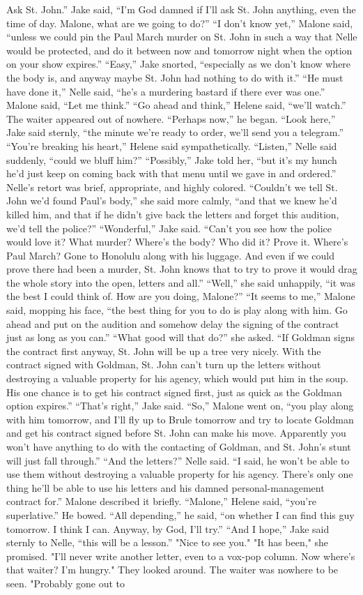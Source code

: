 \documentclass{novel}
\begin{document}
Ask St. John.” Jake said, “I’m God damned if I'll ask St. John anything, even the time of day. Malone, what are we going to do?” “I don’t know yet,” Malone said, “unless we could pin the Paul March murder on St. John in such a way that Nelle would be protected, and do it between now and tomorrow night when the option on your show expires.” “Easy,” Jake snorted, “especially as we don’t know where the body is, and anyway maybe St. John had nothing to do with it.” “He must have done it,” Nelle said, “he’s a murdering bastard if there ever was one.” Malone said, “Let me think.” “Go ahead and think,” Helene said, “we’ll watch.” The waiter appeared out of nowhere. “Perhaps now,” he began. “Look here,” Jake said sternly, “the minute we’re ready to order, we’ll send you a telegram.” “You’re breaking his heart,” Helene said sympathetically. “Listen,” Nelle said suddenly, “could we bluff him?” “Possibly,” Jake told her, “but it’s my hunch he’d just keep on coming back with that menu until we gave in and ordered.” Nelle’s retort was brief, appropriate, and highly colored. “Couldn’t we tell St. John we’d found Paul’s body,” she said more calmly, “and that we knew he’d killed him, and that if he didn’t give back the letters and forget this audition, we’d tell the police?” “Wonderful,” Jake said. “Can’t you see how the police would love it? What murder? Where’s the body? Who did it? Prove it. Where’s Paul March? Gone to Honolulu along with his luggage. And even if we could prove there had been a murder, St. John knows that to try to prove it would drag the whole story into the open, letters and all.” “Well,” she said unhappily, “it was the best I could think of. How are you doing, Malone?” “It seems to me,” Malone said, mopping his face, “the best thing for you to do is play along with him. Go ahead and put on the audition and somehow delay the signing of the contract just as long as you can.” “What good will that do?” she asked. “If Goldman signs the contract first anyway, St. John will be up a tree very nicely. With the contract signed with Goldman, St. John can’t turn up the letters without destroying a valuable property for his agency, which would put him in the soup. His one chance is to get his contract signed first, just as quick as the Goldman option expires.” “That’s right,” Jake said. “So,” Malone went on, “you play along with him tomorrow, and I’ll fly up to Brule tomorrow and try to locate Goldman and get his contract signed before St. John can make his move. Apparently you won’t have anything to do with the contacting of Goldman, and St. John’s stunt will just fall through.” “And the letters?” Nelle said. “I said, he won’t be able to use them without destroying a valuable property for his agency. There’s only one thing he’ll be able to use his letters and his damned personal-management contract for.” Malone described it briefly. “Malone,” Helene said, “you’re superlative.” He bowed. “All depending,” he said, “on whether I can find this guy tomorrow. I think I can. Anyway, by God, I’ll try.” “And I hope,” Jake said sternly to Nelle, “this will be a lesson.” "Nice to see you." "It has been," she promised. "I'll never write another letter, even to a vox-pop column. Now where's that waiter? I'm hungry." They looked around. The waiter was nowhere to be seen. "Probably gone out to 
\end{document}

